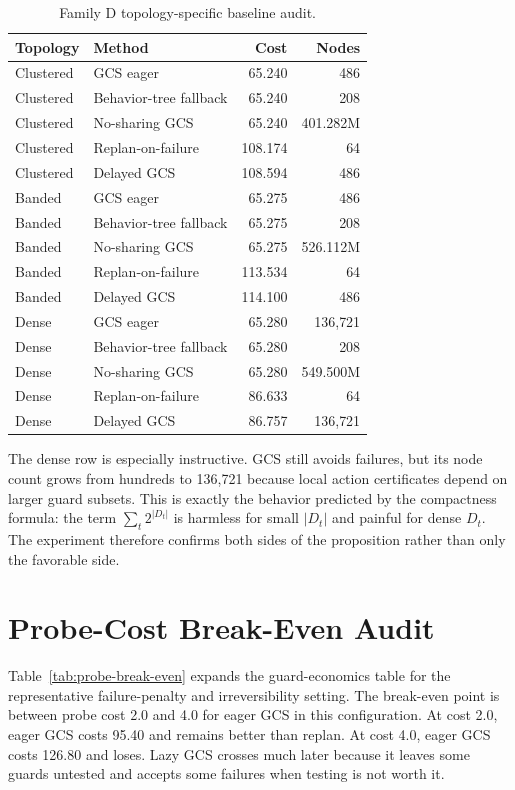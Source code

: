 \documentclass{article}
\begin{document}
\begin{table}[p]
\centering
\caption{Family D topology-specific baseline audit.}
\label{tab:topology-baseline-audit}
\scriptsize
\begin{tabular}{llrr}
\toprule
Topology & Method & Cost & Nodes\\
\midrule
Clustered & GCS eager & 65.240 & 486\\
Clustered & Behavior-tree fallback & 65.240 & 208\\
Clustered & No-sharing GCS & 65.240 & 401.282M\\
Clustered & Replan-on-failure & 108.174 & 64\\
Clustered & Delayed GCS & 108.594 & 486\\
\midrule
Banded & GCS eager & 65.275 & 486\\
Banded & Behavior-tree fallback & 65.275 & 208\\
Banded & No-sharing GCS & 65.275 & 526.112M\\
Banded & Replan-on-failure & 113.534 & 64\\
Banded & Delayed GCS & 114.100 & 486\\
\midrule
Dense & GCS eager & 65.280 & 136{,}721\\
Dense & Behavior-tree fallback & 65.280 & 208\\
Dense & No-sharing GCS & 65.280 & 549.500M\\
Dense & Replan-on-failure & 86.633 & 64\\
Dense & Delayed GCS & 86.757 & 136{,}721\\
\bottomrule
\end{tabular}
\end{table}

The dense row is especially instructive. GCS still avoids failures, but its node count grows from hundreds to 136,721 because local action certificates depend on larger guard subsets. This is exactly the behavior predicted by the compactness formula: the term $\sum_t2^{|D_t|}$ is harmless for small $|D_t|$ and painful for dense $D_t$. The experiment therefore confirms both sides of the proposition rather than only the favorable side.

\section{Probe-Cost Break-Even Audit}
Table~\ref{tab:probe-break-even} expands the guard-economics table for the representative failure-penalty and irreversibility setting. The break-even point is between probe cost 2.0 and 4.0 for eager GCS in this configuration. At cost 2.0, eager GCS costs 95.40 and remains better than replan. At cost 4.0, eager GCS costs 126.80 and loses. Lazy GCS crosses much later because it leaves some guards untested and accepts some failures when testing is not worth it.
\end{document}
